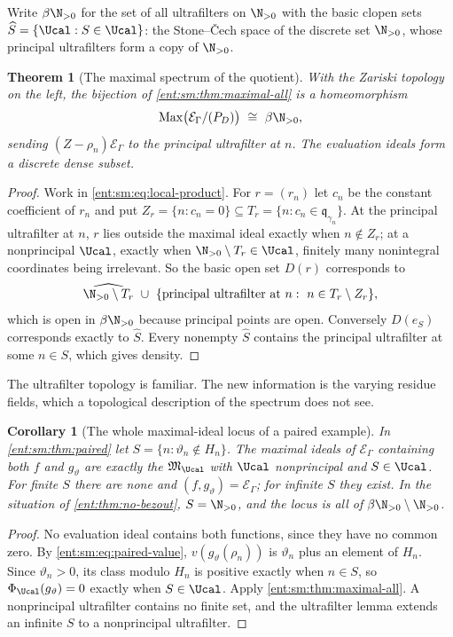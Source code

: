 \documentclass[11pt]{article}
\newtheorem{theorem}{Theorem}[section]
\theoremstyle{plain}
\theoremstyle{plain}
\theoremstyle{plain}
\newtheorem{corollary}[corollary]{Corollary}
\theoremstyle{definition}
\theoremstyle{definition}
\theoremstyle{definition}
\theoremstyle{definition}
\theoremstyle{remark}
\newcommand{\E}{\mathcal E_\Gamma}
\begin{document}
Write $\beta\N_{>0}$ for the set of all ultrafilters on $\N_{>0}$ with the
basic clopen sets $\widehat S=\{\Ucal:S\in\Ucal\}$: the Stone--\v{C}ech space
of the discrete set $\N_{>0}$, whose principal ultrafilters form a copy of
$\N_{>0}$.

\begin{theorem}[The maximal spectrum of the quotient]\label{ent:sm:thm:beta}
With the Zariski topology on the left, the bijection of
\cref{ent:sm:thm:maximal-all} is a homeomorphism
\[
 \operatorname{Max}\bigl(\E/(P_D)\bigr)\ \cong\ \beta\N_{>0},
\]
sending $(Z-\rho_n)\E$ to the principal ultrafilter at $n$. The evaluation
ideals form a discrete dense subset.
\end{theorem}
\begin{proof}
Work in \eqref{ent:sm:eq:local-product}. For $r=(r_n)$ let $c_n$ be the
constant coefficient of $r_n$ and put
$Z_r=\{n:c_n=0\}\subseteq T_r=\{n:c_n\in\mathfrak q_{\gamma_n}\}$. At the
principal ultrafilter at $n$, $r$ lies outside the maximal ideal exactly when
$n\notin Z_r$; at a nonprincipal $\Ucal$, exactly when
$\N_{>0}\setminus T_r\in\Ucal$, finitely many nonintegral coordinates being
irrelevant. So the basic open set $D(r)$ corresponds to
\[
 \widehat{\N_{>0}\setminus T_r}\ \cup\
 \{\text{principal ultrafilter at }n:\ n\in T_r\setminus Z_r\},
\]
which is open in $\beta\N_{>0}$ because principal points are open.
Conversely $D(e_S)$ corresponds exactly to $\widehat S$. Every nonempty
$\widehat S$ contains the principal ultrafilter at some $n\in S$, which gives
density.
\end{proof}

The ultrafilter topology is familiar. The new information is the varying
residue fields, which a topological description of the spectrum does not
see.

\begin{corollary}[The whole maximal-ideal locus of a paired example]
\label{ent:sm:cor:boundary-pair}
In \cref{ent:sm:thm:paired} let $S=\{n:\vartheta_n\notin H_n\}$. The maximal
ideals of $\E$ containing both $f$ and $g_\vartheta$ are exactly the
$\mathfrak M_\Ucal$ with $\Ucal$ nonprincipal and $S\in\Ucal$. For finite $S$
there are none and $(f,g_\vartheta)=\E$; for infinite $S$ they exist. In the
situation of \cref{ent:thm:no-bezout}, $S=\N_{>0}$, and the locus is all of
$\beta\N_{>0}\setminus\N_{>0}$.
\end{corollary}
\begin{proof}
No evaluation ideal contains both functions, since they have no common zero.
By \eqref{ent:sm:eq:paired-value}, $v(g_\vartheta(\rho_n))$ is $\vartheta_n$
plus an element of $H_n$. Since $\vartheta_n>0$, its class modulo $H_n$ is
positive exactly when $n\in S$, so $\Phi_\Ucal(g_\vartheta)=0$ exactly when
$S\in\Ucal$. Apply \cref{ent:sm:thm:maximal-all}. A nonprincipal ultrafilter
contains no finite set, and the ultrafilter lemma extends an infinite $S$ to
a nonprincipal ultrafilter.
\end{proof}
\end{document}

